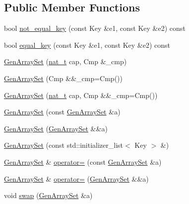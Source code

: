 \subsection*{Public Member Functions}
\begin{DoxyCompactItemize}
\item 
bool \hyperlink{class_designar_1_1_gen_array_set_a048871f9ab15af3c26cfda4dbb47d272}{not\+\_\+equal\+\_\+key} (const Key \&e1, const Key \&e2) const
\item 
bool \hyperlink{class_designar_1_1_gen_array_set_a2874b036273f5cc48275bd1242453930}{equal\+\_\+key} (const Key \&e1, const Key \&e2) const
\item 
\hyperlink{class_designar_1_1_gen_array_set_a51b519b8c338a8f0e4db3d50e77bfd6f}{Gen\+Array\+Set} (\hyperlink{namespace_designar_aa72662848b9f4815e7bf31a7cf3e33d1}{nat\+\_\+t} cap, Cmp \&\+\_\+cmp)
\item 
\hyperlink{class_designar_1_1_gen_array_set_a6dd76e1d1ccb49b3e984c18b05c98dd2}{Gen\+Array\+Set} (Cmp \&\&\+\_\+cmp=Cmp())
\item 
\hyperlink{class_designar_1_1_gen_array_set_ab2ffd26edcd909f936394e538b43d2c4}{Gen\+Array\+Set} (\hyperlink{namespace_designar_aa72662848b9f4815e7bf31a7cf3e33d1}{nat\+\_\+t} cap, Cmp \&\&\+\_\+cmp=Cmp())
\item 
\hyperlink{class_designar_1_1_gen_array_set_a2cdf04753abc21b6f10a795fdac2238c}{Gen\+Array\+Set} (const \hyperlink{class_designar_1_1_gen_array_set}{Gen\+Array\+Set} \&a)
\item 
\hyperlink{class_designar_1_1_gen_array_set_af0b02756ac00f4b364422908a0e94e73}{Gen\+Array\+Set} (\hyperlink{class_designar_1_1_gen_array_set}{Gen\+Array\+Set} \&\&a)
\item 
\hyperlink{class_designar_1_1_gen_array_set_a53cc511f4539c16b1542f56979433c2a}{Gen\+Array\+Set} (const std\+::initializer\+\_\+list$<$ Key $>$ \&)
\item 
\hyperlink{class_designar_1_1_gen_array_set}{Gen\+Array\+Set} \& \hyperlink{class_designar_1_1_gen_array_set_ab30a4cf17a20eb6005cfed15762c1568}{operator=} (const \hyperlink{class_designar_1_1_gen_array_set}{Gen\+Array\+Set} \&a)
\item 
\hyperlink{class_designar_1_1_gen_array_set}{Gen\+Array\+Set} \& \hyperlink{class_designar_1_1_gen_array_set_afb89b3abb4a394341430ca8ae29a9ca2}{operator=} (\hyperlink{class_designar_1_1_gen_array_set}{Gen\+Array\+Set} \&\&a)
\item 
void \hyperlink{class_designar_1_1_gen_array_set_ab117cdee923c27d7922a02336440b2ff}{swap} (\hyperlink{class_designar_1_1_gen_array_set}{Gen\+Array\+Set} \&a)

\end{DoxyCompactItemize}
